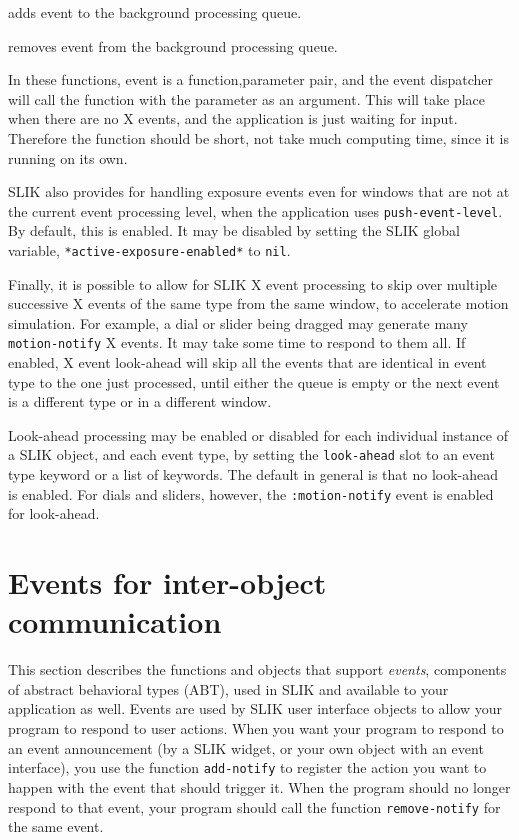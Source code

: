 \documentclass[twoside,openright,11pt]{report}
\newcommand{\tp}[1]{\texttt{#1}}
\begin{document}
{adds event to the background processing queue.}

{removes event from the background processing queue.}

In these functions, event is a function,parameter pair, and the event
dispatcher will call the function with the parameter as an argument.
This will take place when there are no X events, and the application
is just waiting for input.  Therefore the function should be short,
not take much computing time, since it is running on its own.

SLIK also provides for handling exposure events even for windows that
are not at the current event processing level, when the application
uses \tp{push-event-level}.  By default, this is enabled.  It may be
disabled by setting the SLIK global variable,
\tp{*active-exposure-enabled*} to \tp{nil}.

Finally, it is possible to allow for SLIK X event processing to skip
over multiple successive X events of the same type from the same
window, to accelerate motion simulation.  For example, a dial or
slider being dragged may generate many \tp{motion-notify} X events.
It may take some time to respond to them all.  If enabled, X event
look-ahead will skip all the events that are identical in event type
to the one just processed, until either the queue is empty or the next
event is a different type or in a different window.

Look-ahead processing may be enabled or disabled for each individual
instance of a SLIK object, and each event type, by setting the
\tp{look-ahead} slot to an event type keyword or a list of keywords.
The default in general is that no look-ahead is enabled.  For dials
and sliders, however, the \tp{:motion-notify} event is enabled for
look-ahead.

\section{Events for inter-object communication} \label{sec:events}

This section describes the functions and objects that support
\emph{events}, components of abstract behavioral types (ABT), used in
SLIK and available to your application as well.  Events are used by
SLIK user interface objects to allow your program to respond to user
actions.  When you want your program to respond to an event
announcement (by a SLIK widget, or your own object with an event
interface), you use the function \tp{add-notify} to register the
action you want to happen with the event that should trigger it.  When
the program should no longer respond to that event, your program
should call the function \tp{remove-notify} for the same event.
\end{document}

